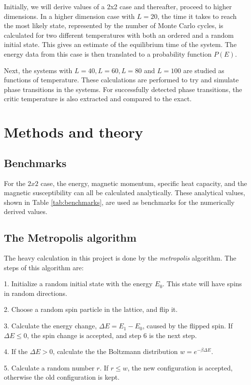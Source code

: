 \documentclass[12pt,english,a4paper]{article}
\begin{document}
Initially, we will derive values of a 2x2 case and thereafter, proceed to higher dimensions. In a higher dimension case with $L=20$, the time it takes to reach the most likely state, represented by the number of Monte Carlo cycles, is calculated for two different temperatures with both an ordered and a random initial state. This gives an estimate of the equilibrium time of the system. The energy data from this case is then translated to a probability function $P(E)$. 

Next, the systems with $L=40, L=60, L=80$ and $L=100$ are studied as functions of temperature. These calculations are performed to try and simulate phase transitions in the systems. For successfully detected phase transitions, the critic temperature is also extracted and compared to the exact.

\section{Methods and theory}

\subsection{Benchmarks}

For the $2x2$ case, the energy, magnetic momentum, specific heat capacity, and the magnetic susceptibility can all be calculated analytically. These analytical values, shown in Table \ref{tab:benchmarks}, are used as benchmarks for the numerically derived values.

\subsection{The Metropolis algorithm}

The heavy calculation in this project is done by the \textit{metropolis} algorithm. The steps of this algorithm are:

1. Initialize a random initial state with the energy $E_0$. This state will have spins in random directions. 

2. Choose a random spin particle in the lattice, and flip it.

3. Calculate the energy change, $\Delta E=E_1-E_0$, caused by the flipped spin. If $\Delta E \le 0$, the spin change is accepted, and step 6 is the next step.

4. If the $\Delta E > 0$, calculate the the Boltzmann distribution $w=e^{-\beta \Delta E}$.

5. Calculate a random number $r$. If $r \le w$, the new configuration is accepted, otherwise the old configuration is kept.
\end{document}
